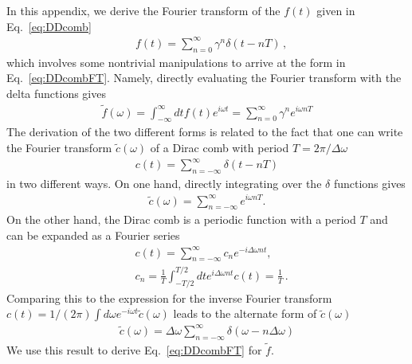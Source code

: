 \begin{refsection}
In this appendix, we derive the Fourier transform of the $f(t)$ given in Eq.~\eqref{eq:DDcomb}
\begin{align}
\label{eq:DDcombApp}
&f(t)=\sum_{n=0}^\infty \gamma^n \delta\left(t-nT\right) \,,
\end{align}
which involves some nontrivial manipulations to arrive at the form in Eq.~\eqref{eq:DDcombFT}.
Namely, directly evaluating the Fourier transform with the delta functions gives
\begin{align}
\tilde f(\omega)=\int_{-\infty}^{\infty}dt f(t) e^{i\omega t}=\sum_{n=0}^\infty \gamma^n e^{i\omega nT}
\end{align}
The derivation of the two different forms is related to the fact that one can write the Fourier transform $\tilde c(\omega)$ of a Dirac comb with period $T=2\pi/\Delta\omega$
\begin{align}
c(t)=\sum_{n=-\infty}^{\infty}\delta(t-nT)
\end{align}
in two different ways. On one hand, directly integrating over the $\delta$ functions gives
\begin{align}
\tilde c(\omega)=\sum_{n=-\infty}^{\infty}e^{i\omega n T}.
\end{align}
On the other hand, the Dirac comb is a periodic function with a period $T$ and can be expanded as a Fourier series
\begin{align}
&c(t)=\sum_{n=-\infty}^{\infty}c_n e^{-i\Delta \omega n t}, \nonumber \\
&c_n=\frac{1}{T}\int_{-T/2}^{T/2}dte^{i\Delta \omega nt}c(t) =\frac{1}{T} \,.
\end{align}
Comparing this to the expression for the inverse Fourier transform $c(t)=1/(2\pi)\int d\omega e^{-i\omega t}\tilde c(\omega)$ leads to the alternate form of $\tilde c(\omega)$
\begin{align}
\tilde c(\omega)=\Delta \omega \sum_{n=-\infty}^{\infty}\delta(\omega- n \Delta \omega )
\label{eq:cFT}
\end{align}
We use this result to derive Eq.~\eqref{eq:DDcombFT} for $\tilde f$. 


\end{refsection}
